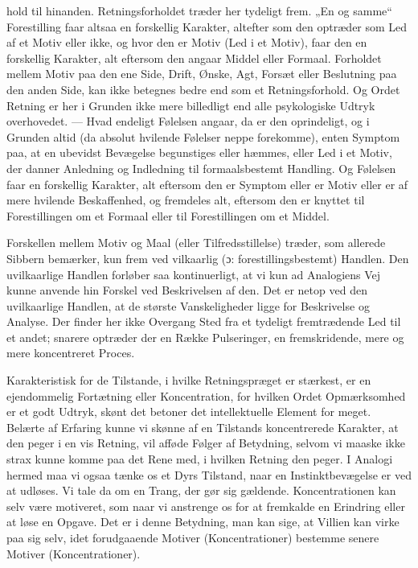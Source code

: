 \documentclass[12pt,a4paper,openany]{book}
\newcommand{\opage}[1]{\marginnote{\footnotesize\textit{[#1]}}}
\begin{document}
\setcounter{footnote}{0}%
\opage{49}hold til hinanden. Retningsforholdet træder her tydeligt frem.
„En og samme“ Forestilling faar altsaa en forskellig Karakter,
altefter som den optræder som Led af et Motiv eller ikke, og
hvor den er Motiv (Led i et Motiv), faar den en forskellig Karakter,
alt eftersom den angaar Middel eller Formaal. Forholdet
mellem Motiv paa den ene Side, Drift, Ønske, Agt, Forsæt
eller Beslutning paa den anden Side, kan ikke betegnes bedre
end som et Retningsforhold. Og Ordet Retning er her i Grunden
ikke mere billedligt end alle psykologiske Udtryk overhovedet.
--- Hvad endeligt Følelsen angaar, da er den oprindeligt,
og i Grunden altid (da absolut hvilende Følelser neppe
forekomme), enten Symptom paa, at en ubevidst Bevægelse
begunstiges eller hæmmes, eller Led i et Motiv, der danner
Anledning og Indledning til formaalsbestemt Handling. Og
Følelsen faar en forskellig Karakter, alt eftersom den er Symptom
eller er Motiv eller er af mere hvilende Beskaffenhed, og
fremdeles alt, eftersom den er knyttet til Forestillingen om et
Formaal eller til Forestillingen om et Middel.

Forskellen mellem Motiv og Maal (eller Tilfredsstillelse)
træder, som allerede Sibbern bemærker, kun frem ved vilkaarlig
(ɔ: forestillingsbestemt) Handlen. Den uvilkaarlige Handlen
forløber saa kontinuerligt, at vi kun ad Analogiens Vej kunne
anvende hin Forskel ved Beskrivelsen af den. Det er netop ved
den uvilkaarlige Handlen, at de største Vanskeligheder ligge
for Beskrivelse og Analyse. Der finder her ikke Overgang
Sted fra et tydeligt fremtrædende Led til et andet; snarere optræder
der en Række Pulseringer, en fremskridende, mere og
mere koncentreret Proces.

Karakteristisk for de Tilstande, i hvilke Retningspræget er
stærkest, er en ejendommelig Fortætning eller Koncentration,
for hvilken Ordet Opmærksomhed er et godt Udtryk, skønt det
betoner det intellektuelle Element for meget. Belærte af Erfaring
kunne vi skønne af en Tilstands koncentrerede Karakter,
at den peger i en vis Retning, vil afføde Følger af Betydning,
selvom vi maaske ikke strax kunne komme paa det Rene med,
i hvilken Retning den peger. I Analogi hermed maa vi ogsaa
\setcounter{footnote}{0}%
\opage{50}tænke os et Dyrs Tilstand, naar en Instinktbevægelse er ved
at udløses. Vi tale da om en Trang, der gør sig gældende.
Koncentrationen kan selv være motiveret, som naar vi anstrenge
os for at fremkalde en Erindring eller at løse en Opgave. Det
er i denne Betydning, man kan sige, at Villien kan virke paa
sig selv, idet forudgaaende Motiver (Koncentrationer) bestemme
senere Motiver (Koncentrationer).
\end{document}
